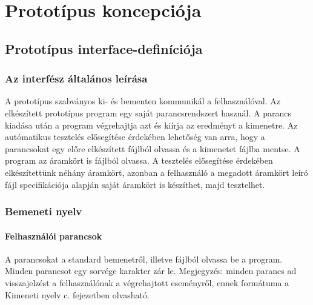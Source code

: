 %
\chapter{Prototípus koncepciója}

\parindent 0pt
\setcounter{secnumdepth}{3}
\setcounter{tocdepth}{3}
\thispagestyle{fancy}

\section{Prototípus interface-definíciója}

\subsection{Az interfész általános leírása}
A prototípus szabványos ki- és bementen kommunikál a felhasználóval. Az elkészített prototípus program egy
saját parancsrendszert használ. A parancs kiadása után a program végrehajtja azt és kiírja az eredményt a kimenetre. Az autómatikus tesztelés elősegítése érdekében lehetőség van arra, hogy 
a parancsokat egy előre elkészített fájlból olvassa és a kimenetet fájlba mentse. A program az áramkört is
fájlból olvassa. A tesztelés elősegítése érdekében elkészítettünk néhány áramkört, azonban a felhasználó a megadott áramkört leíró fájl specifikációja alapján saját áramkört is készíthet, majd tesztelhet. 


\subsection{Bemeneti nyelv}

\subsubsection{Felhasználói parancsok}

A parancsokat a standard bemenetről, illetve fájlból olvassa be a program. Minden parancsot egy sorvége karakter zár le.\newline
Megjegyzés: minden parancs ad visszajelzést a felhasználónak a végrehajtott eseményről, ennek formátuma a Kimeneti nyelv c. fejezetben olvasható.\newline

